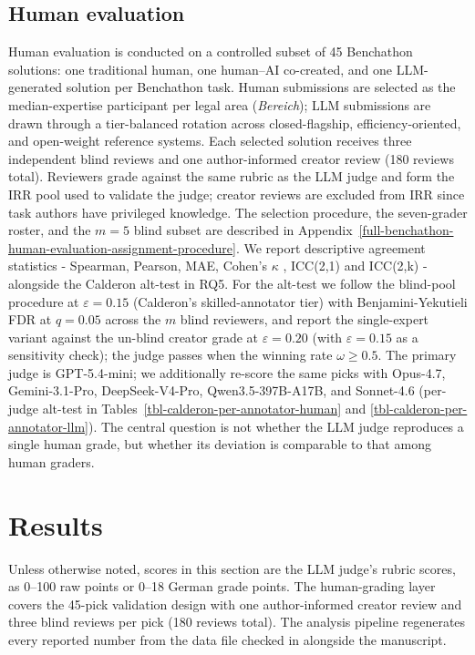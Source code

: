 \documentclass[11pt]{article}
\begin{document}
\subsection{Human evaluation}\label{sec-human-eval}

Human evaluation is conducted on a controlled subset of 45 Benchathon
solutions: one traditional human, one human--AI co-created, and one
LLM-generated solution per Benchathon task. Human submissions are
selected as the median-expertise participant per legal area
(\emph{Bereich}); LLM submissions are drawn through a tier-balanced
rotation across closed-flagship, efficiency-oriented, and open-weight
reference systems. Each selected solution receives three independent
blind reviews and one author-informed creator review (180 reviews
total). Reviewers grade against the same rubric as the LLM judge and
form the IRR pool used to validate the judge; creator reviews are
excluded from IRR since task authors have privileged knowledge. The
selection procedure, the seven-grader roster, and the \(m=5\) blind
subset are described in
Appendix~\ref{full-benchathon-human-evaluation-assignment-procedure}. We
report descriptive agreement statistics - Spearman, Pearson, MAE,
Cohen's \(\kappa\) \citep{cohen1960coefficient}, ICC(2,1) and ICC(2,k)
\citep{shrout1979intraclass, koo2016guideline} - alongside the Calderon
alt-test \citep{calderon2025} in RQ5. For the alt-test we follow the
blind-pool procedure at \(\varepsilon=0.15\) (Calderon's
skilled-annotator tier) with Benjamini-Yekutieli FDR at \(q=0.05\)
across the \(m\) blind reviewers, and report the single-expert variant
against the un-blind creator grade at \(\varepsilon=0.20\) (with
\(\varepsilon=0.15\) as a sensitivity check); the judge passes when the
winning rate \(\omega \geq 0.5\). The primary judge is GPT-5.4-mini; we
additionally re-score the same picks with Opus-4.7, Gemini-3.1-Pro,
DeepSeek-V4-Pro, Qwen3.5-397B-A17B, and Sonnet-4.6 (per-judge alt-test
in Tables~\ref{tbl-calderon-per-annotator-human} and
\ref{tbl-calderon-per-annotator-llm}). The central question is not
whether the LLM judge reproduces a single human grade, but whether its
deviation is comparable to that among human graders.

\section{Results}\label{results}

Unless otherwise noted, scores in this section are the LLM judge's
rubric scores, as 0--100 raw points or 0--18 German grade points. The
human-grading layer covers the 45-pick validation design with one
author-informed creator review and three blind reviews per pick (180
reviews total). The analysis pipeline regenerates every reported number
from the data file checked in alongside the manuscript.
\end{document}
